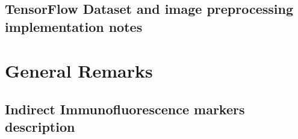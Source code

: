 \documentclass[biblatexBackend=bibtex]{tumthesis}
\begin{document}
\section{TensorFlow Dataset and image preprocessing implementation notes}
\label{sec:appendix:tfds}


\chapter{General Remarks}
\label{Appendix-general-remarks}


\section{Indirect Immunofluorescence markers description}
\label{sec:appendix:if_markers}


\backmatter


\listoffigures

\vspace*{1.5cm}

\listoftables





\printindex

\printglossary[type=\acronymtype]

\printbibliography[heading=bibintoc]

\listoffixmes
%
\end{document}
